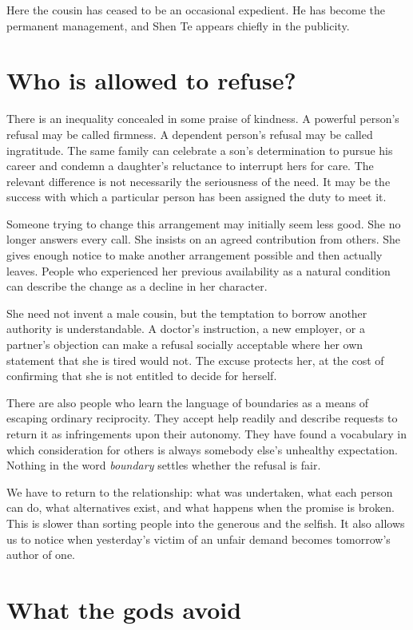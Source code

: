 \documentclass[12pt,a4paper]{book}
\begin{document}
Here the cousin has ceased to be an occasional expedient. He has become the permanent management, and Shen Te appears chiefly in the publicity.

\section*{Who is allowed to refuse?}

There is an inequality concealed in some praise of kindness. A powerful person's refusal may be called firmness. A dependent person's refusal may be called ingratitude. The same family can celebrate a son's determination to pursue his career and condemn a daughter's reluctance to interrupt hers for care. The relevant difference is not necessarily the seriousness of the need. It may be the success with which a particular person has been assigned the duty to meet it.

Someone trying to change this arrangement may initially seem less good. She no longer answers every call. She insists on an agreed contribution from others. She gives enough notice to make another arrangement possible and then actually leaves. People who experienced her previous availability as a natural condition can describe the change as a decline in her character.

She need not invent a male cousin, but the temptation to borrow another authority is understandable. A doctor's instruction, a new employer, or a partner's objection can make a refusal socially acceptable where her own statement that she is tired would not. The excuse protects her, at the cost of confirming that she is not entitled to decide for herself.

There are also people who learn the language of boundaries as a means of escaping ordinary reciprocity. They accept help readily and describe requests to return it as infringements upon their autonomy. They have found a vocabulary in which consideration for others is always somebody else's unhealthy expectation. Nothing in the word \emph{boundary} settles whether the refusal is fair.

We have to return to the relationship: what was undertaken, what each person can do, what alternatives exist, and what happens when the promise is broken. This is slower than sorting people into the generous and the selfish. It also allows us to notice when yesterday's victim of an unfair demand becomes tomorrow's author of one.

\section*{What the gods avoid}
\end{document}
